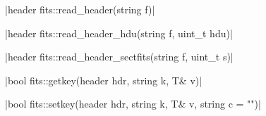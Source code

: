 \funcitem \cppinline|header fits::read_header(string f)| 

\cppinline|header fits::read_header_hdu(string f, uint_t hdu)|

\cppinline|header fits::read_header_sectfits(string f, uint_t s)|

\funcitem \cppinline|bool fits::getkey(header hdr, string k, T& v)| 

\funcitem \cppinline|bool fits::setkey(header hdr, string k, T& v, string c = "")| 
